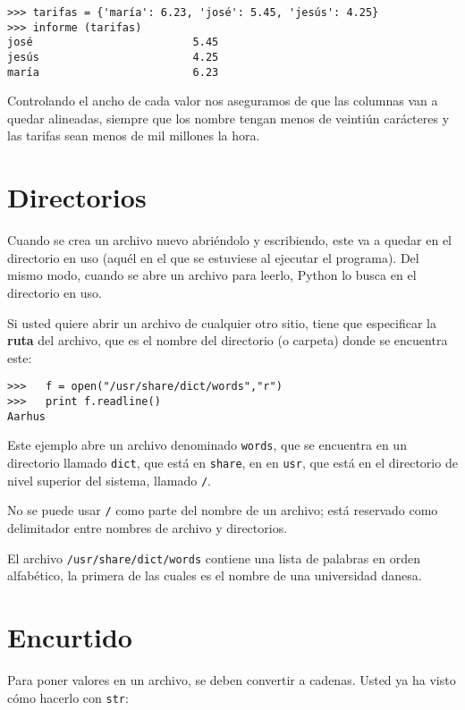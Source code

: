 \beforeverb
\begin{verbatim}
>>> tarifas = {'maría': 6.23, 'josé': 5.45, 'jesús': 4.25}
>>> informe (tarifas)
josé                         5.45
jesús                        4.25
maría                        6.23
\end{verbatim}
\afterverb
%
Controlando el ancho de cada valor nos aseguramos de que las columnas
van a quedar alineadas, siempre que los nombre tengan menos de veintiún
carácteres y las tarifas sean menos de mil millones la hora.


\section{Directorios}

Cuando se crea un archivo nuevo abriéndolo y escribiendo, este 
va a quedar en el directorio en uso (aquél en el que se estuviese al ejecutar
el programa). Del mismo modo, cuando se abre un archivo para leerlo,
Python lo busca en el directorio en uso.

Si usted quiere abrir un archivo de cualquier otro sitio, tiene que
especificar la {\bf ruta} del archivo, que es el nombre del directorio
(o carpeta) donde se encuentra este:

\beforeverb
\begin{verbatim}
>>>   f = open("/usr/share/dict/words","r")
>>>   print f.readline()
Aarhus
\end{verbatim}
\afterverb
%
Este ejemplo abre un archivo denominado \texttt{words}, que se encuentra en un
directorio llamado \texttt{dict}, que está en \texttt{share}, en
en \texttt{usr}, que está en el directorio de nivel superior del
sistema, llamado \texttt{/}.


No se puede usar \texttt{/} como parte del nombre de un archivo; está
reservado como delimitador entre nombres de archivo y directorios.

El archivo \texttt{/usr/share/dict/words} contiene una lista de palabras
en orden alfabético, la primera de las cuales es el nombre de una
universidad danesa.


\section{Encurtido}

Para poner valores en un archivo,  se deben convertir a cadenas. 
Usted ya ha visto cómo hacerlo con \texttt{str}:

